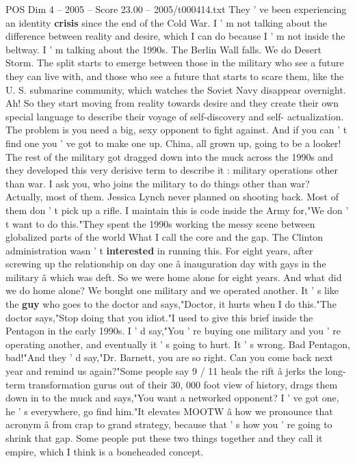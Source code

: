 \begin{textsample}{POS Dim 4 – 2005 – Score 23.00 – 2005/t000414.txt}
They ' ve been experiencing an identity \textbf{crisis} since the end of the Cold War.
I ' m not talking about the difference between reality and desire, which I can do because I ' m not inside the beltway.
I ' m talking about the 1990s.
The Berlin Wall falls.
We do Desert Storm.
The split starts to emerge between those in the military who see a future they can live with, and those who see a future that starts to scare them, like the U.
S. submarine community, which watches the Soviet Navy disappear overnight.
Ah!
So they start moving from reality towards desire and they create their own special language to describe their voyage of self-discovery and self- actualization.
The problem is you need a big, sexy opponent to fight against.
And if you can ' t find one you ' ve got to make one up.
China, all grown up, going to be a looker!
The rest of the military got dragged down into the muck across the 1990s and they developed this very derisive term to describe it : military operations other than war.
I ask you, who joins the military to do things other than war?
Actually, most of them.
Jessica Lynch never planned on shooting back.
Most of them don ' t pick up a rifle.
I maintain this is code inside the Army for,"We don ' t want to do this."They spent the 1990s working the messy scene between globalized parts of the world What I call the core and the gap.
The Clinton administration wasn ' t \textbf{interested} in running this.
For eight years, after screwing up the relationship on day one â inauguration day with gays in the military â which was deft.
So we were home alone for eight years.
And what did we do home alone?
We bought one military and we operated another.
It ' s like the \textbf{guy} who goes to the doctor and says,"Doctor, it hurts when I do this."The doctor says,"Stop doing that you idiot."I used to give this brief inside the Pentagon in the early 1990s.
I ' d say,"You ' re buying one military and you ' re operating another, and eventually it ' s going to hurt.
It ' s wrong.
Bad Pentagon, bad!"And they ' d say,"Dr.
Barnett, you are so right.
Can you come back next year and remind us again?"Some people say 9 / 11 heals the rift â jerks the long-term transformation gurus out of their 30, 000 foot view of history, drags them down in to the muck and says,"You want a networked opponent?
I ' ve got one, he ' s everywhere, go find him."It elevates MOOTW â how we pronounce that acronym â from crap to grand strategy, because that ' s how you ' re going to shrink that gap.
Some people put these two things together and they call it empire, which I think is a boneheaded concept.

\end{textsample}

